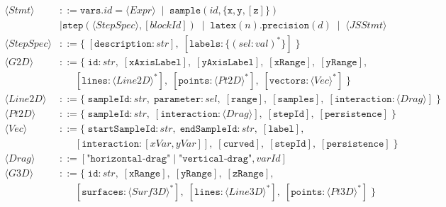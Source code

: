 \begin{minipage}{\textwidth}
\begin{align*}
  \langle \textit{Stmt} \rangle &::= \texttt{vars.}\textit{id} \; \texttt{=} \; \langle \textit{Expr} \rangle \;\mid\;
      \texttt{sample}(\textit{id}, \{ \texttt{x}, \texttt{y}, [\texttt{z}] \}) \\
      &\mid \texttt{step}(\langle \textit{StepSpec} \rangle, [\textit{blockId}]) \;\mid\;
      \texttt{latex}(\textit{n}).\texttt{precision}(\textit{d}) \;\mid\; \langle \textit{JSStmt} \rangle \\
  \langle \textit{StepSpec} \rangle &::= \{ \; [\texttt{description}: \textit{str}], \;
      [\texttt{labels}: \{ (\textit{sel}: \textit{val})^* \}] \; \} \\[3pt]
  \langle \textit{G2D} \rangle &::= \{ \; \texttt{id}: \textit{str}, \;
      [\texttt{xAxisLabel}], \; [\texttt{yAxisLabel}], \;
      [\texttt{xRange}], \; [\texttt{yRange}], \\
      &\quad\;\; [\texttt{lines}: \langle \textit{Line2D} \rangle^*], \;
      [\texttt{points}: \langle \textit{Pt2D} \rangle^*], \;
      [\texttt{vectors}: \langle \textit{Vec} \rangle^*] \; \} \\[3pt]
  \langle \textit{Line2D} \rangle &::= \{ \; \texttt{sampleId}: \textit{str}, \;
      \texttt{parameter}: \textit{sel}, \;
      [\texttt{range}], \; [\texttt{samples}], \;
      [\texttt{interaction}: \langle \textit{Drag} \rangle] \; \} \\
  \langle \textit{Pt2D} \rangle &::= \{ \; \texttt{sampleId}: \textit{str}, \;
      [\texttt{interaction}: \langle \textit{Drag} \rangle], \;
      [\texttt{stepId}], \;
      [\texttt{persistence}] \; \} \\
  \langle \textit{Vec} \rangle &::= \{ \; \texttt{startSampleId}: \textit{str}, \;
      \texttt{endSampleId}: \textit{str}, \;
      [\texttt{label}], \\
      &\quad\;\; [\texttt{interaction}: [\textit{xVar}, \textit{yVar}]], \;
      [\texttt{curved}], \;
      [\texttt{stepId}], \;
      [\texttt{persistence}] \; \} \\
  \langle \textit{Drag} \rangle &::= [\texttt{"horizontal-drag"} \mid \texttt{"vertical-drag"}, \textit{varId}] \\[3pt]
  \langle \textit{G3D} \rangle &::= \{ \; \texttt{id}: \textit{str}, \;
      [\texttt{xRange}], \; [\texttt{yRange}], \; [\texttt{zRange}], \\
      &\quad\;\; [\texttt{surfaces}: \langle \textit{Surf3D} \rangle^*], \;
      [\texttt{lines}: \langle \textit{Line3D} \rangle^*], \;
      [\texttt{points}: \langle \textit{Pt3D} \rangle^*] \; \} \\

\end{align*}
\end{minipage}
